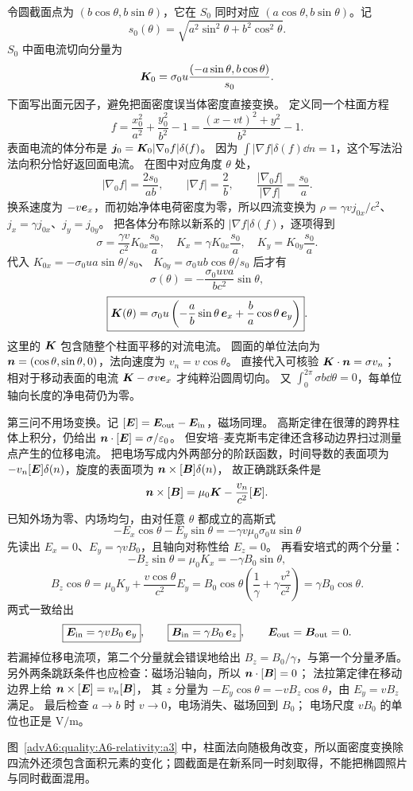 \begin{advsolution}
令圆截面点为 $(b\cos\theta,b\sin\theta)$，它在 $S_0$ 同时对应
$(a\cos\theta,b\sin\theta)$。记
\[
 s_0(\theta)=\sqrt{a^2\sin^2\theta+b^2\cos^2\theta}.
\]
$S_0$ 中面电流切向分量为
\[
 \bm{K}_0=\sigma_0u
 \frac{(-a\sin\theta,b\cos\theta)}{s_0}.
\]
下面写出面元因子，避免把面密度误当体密度直接变换。
定义同一个柱面方程
\[
 f=\frac{x_0^2}{a^2}+\frac{y_0^2}{b^2}-1
 =\frac{(x-vt)^2+y^2}{b^2}-1.
\]
表面电流的体分布是 $\bm{j}_0=\bm{K}_0|\nabla_0 f|\delta(f)$。
因为 $\int|\nabla f|\delta(f)\dd n=1$，这个写法沿法向积分恰好返回面电流。
在图中对应角度 $\theta$ 处，
\[
 |\nabla_0 f|=\frac{2s_0}{ab},\qquad |\nabla f|=\frac2b,
 \qquad \frac{|\nabla_0f|}{|\nabla f|}=\frac{s_0}a.
\]
换系速度为 $-v\bm{e}_x$，而初始净体电荷密度为零，所以四流变换为
$\rho=\gamma vj_{0x}/c^2$、$j_x=\gamma j_{0x}$、$j_y=j_{0y}$。
把各体分布除以新系的 $|\nabla f|\delta(f)$，逐项得到
\[
 \sigma=\frac{\gamma v}{c^2}K_{0x}\frac{s_0}a,
 \quad K_x=\gamma K_{0x}\frac{s_0}a,
 \quad K_y=K_{0y}\frac{s_0}a.
\]
代入 $K_{0x}=-\sigma_0ua\sin\theta/s_0$、
$K_{0y}=\sigma_0ub\cos\theta/s_0$ 后才有
\[
 \boxed{\sigma(\theta)=
 -\frac{\sigma_0uva}{bc^2}\sin\theta},
\]
\[
 \boxed{\bm{K}(\theta)=
 \sigma_0u\left(
 -\frac ab\sin\theta\,\bm{e}_x
 +\frac ba\cos\theta\,\bm{e}_y\right)}.
\]
这里的 $\bm{K}$ 包含随整个柱面平移的对流电流。
圆面的单位法向为 $\bm{n}=(\cos\theta,\sin\theta,0)$，法向速度为 $v_n=v\cos\theta$。
直接代入可核验 $\bm{K}\cdot\bm{n}=\sigma v_n$；
相对于移动表面的电流 $\bm{K}-\sigma v\bm{e}_x$ 才纯粹沿圆周切向。
又 $\int_0^{2\pi}\sigma b\dd\theta=0$，每单位轴向长度的净电荷仍为零。

第三问不用场变换。记 $[\bm{E}]=\bm{E}_{\rm out}-\bm{E}_{\rm in}$，磁场同理。
高斯定律在很薄的跨界柱体上积分，仍给出
$\bm{n}\cdot[\bm{E}]=\sigma/\varepsilon_0$。
但安培--麦克斯韦定律还含移动边界扫过测量点产生的位移电流。
把电场写成内外两部分的阶跃函数，时间导数的表面项为
$-v_n[\bm{E}]\delta(n)$，旋度的表面项为 $\bm{n}\times[\bm{B}]\delta(n)$，
故正确跳跃条件是
\[
 \bm{n}\times[\bm{B}]=\mu_0\bm{K}-\frac{v_n}{c^2}[\bm{E}].
\]
已知外场为零、内场均匀，由对任意 $\theta$ 都成立的高斯式
\[
 -E_x\cos\theta-E_y\sin\theta
 =-\gamma v\mu_0\sigma_0u\sin\theta
\]
先读出 $E_x=0$、$E_y=\gamma vB_0$，且轴向对称性给 $E_z=0$。
再看安培式的两个分量：
\[
 -B_z\sin\theta=\mu_0K_x=-\gamma B_0\sin\theta,
\]
\[
 B_z\cos\theta=\mu_0K_y+\frac{v\cos\theta}{c^2}E_y
 =B_0\cos\theta\left(\frac1\gamma+\gamma\frac{v^2}{c^2}\right)
 =\gamma B_0\cos\theta.
\]
两式一致给出
\[
 \boxed{\bm{E}_{\rm in}=\gamma vB_0\,\bm{e}_y},\qquad
 \boxed{\bm{B}_{\rm in}=\gamma B_0\,\bm{e}_z},
\qquad
 \bm{E}_{\rm out}=\bm{B}_{\rm out}=0.
\]
若漏掉位移电流项，第二个分量就会错误地给出 $B_z=B_0/\gamma$，与第一个分量矛盾。
另外两条跳跃条件也应检查：磁场沿轴向，所以 $\bm{n}\cdot[\bm{B}]=0$；
法拉第定律在移动边界上给 $\bm{n}\times[\bm{E}]=v_n[\bm{B}]$，
其 $z$ 分量为 $-E_y\cos\theta=-vB_z\cos\theta$，由 $E_y=vB_z$ 满足。
最后检查 $a\to b$ 时 $v\to0$，电场消失、磁场回到 $B_0$；
电场尺度 $vB_0$ 的单位也正是 $\mathrm{V/m}$。

图~\ref{advA6:quality:A6-relativity:a3} 中，柱面法向随极角改变，所以面密度变换除四流外还须包含面积元素的变化；圆截面是在新系同一时刻取得，不能把椭圆照片与同时截面混用。
\end{advsolution}

